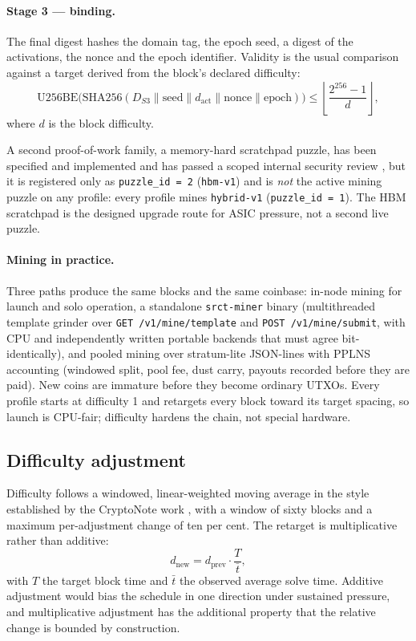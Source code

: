 \documentclass{article}
\begin{document}
\paragraph{Stage 3 --- binding.} The final digest hashes the domain tag, the
epoch seed, a digest of the activations, the nonce and the epoch identifier.
Validity is the usual comparison against a target derived from the block's
declared difficulty:
\begin{equation}
\mathrm{U256BE}\big(\mathrm{SHA256}(D_{S3} \parallel \mathrm{seed} \parallel
d_{\mathrm{act}} \parallel \mathrm{nonce} \parallel \mathrm{epoch})\big)
\leq \left\lfloor \frac{2^{256}-1}{d} \right\rfloor ,
\label{eq:pow}
\end{equation}
where $d$ is the block difficulty.

A second proof-of-work family, a memory-hard scratchpad puzzle, has been
specified and implemented and has passed a scoped internal security review
\cite{srct-hbm-review}, but it is registered only as \texttt{puzzle\_id = 2}
(\texttt{hbm-v1}) and is \emph{not} the active mining puzzle on any profile:
every profile mines \texttt{hybrid-v1} (\texttt{puzzle\_id = 1}). The HBM
scratchpad is the designed upgrade route for ASIC pressure, not a second live
puzzle.

\paragraph{Mining in practice.} Three paths produce the same blocks and the same
coinbase: in-node mining for launch and solo operation, a standalone
\texttt{srct-miner} binary (multithreaded template grinder over
\texttt{GET /v1/mine/template} and \texttt{POST /v1/mine/submit}, with CPU and
independently written portable backends that must agree bit-identically), and
pooled mining over stratum-lite JSON-lines with PPLNS accounting (windowed
split, pool fee, dust carry, payouts recorded before they are paid). New coins
are immature before they become ordinary UTXOs. Every profile starts at
difficulty 1 and retargets every block toward its target spacing, so launch is
CPU-fair; difficulty hardens the chain, not special hardware.

\subsection{Difficulty adjustment}

Difficulty follows a windowed, linear-weighted moving average in the style
established by the CryptoNote work \cite{cryptonote2012whitepaper}, with a
window of sixty blocks and a maximum per-adjustment change of ten per cent. The
retarget is multiplicative rather than additive:
\begin{equation}
d_{\mathrm{new}} = d_{\mathrm{prev}} \cdot \frac{T}{\bar{t}},
\label{eq:retarget}
\end{equation}
with $T$ the target block time and $\bar{t}$ the observed average solve time.
Additive adjustment would bias the schedule in one direction under sustained
pressure, and multiplicative adjustment has the additional property that the
relative change is bounded by construction.
\end{document}
